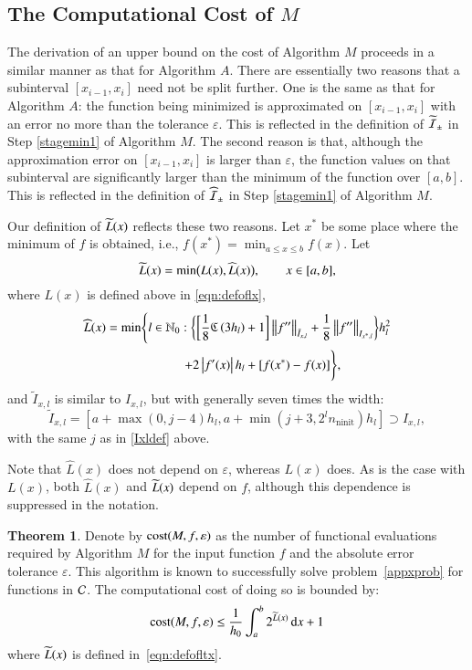\documentclass[review]{elsarticle}
\newcommand{\abstol}{\varepsilon}
\theoremstyle{definition}
\newcommand{\Ixl}{I_{x,l}}
\newcommand{\chL}{\widehat{L}}
\DeclareMathOperator{\ninit}{ninit}
\newtheorem{theorem}{Theorem}
\begin{document}
\subsection{The Computational Cost of $M$} \label{subsec:optcost}
The derivation of an upper bound on the cost of Algorithm $M$ proceeds in a
similar manner as that for Algorithm $A$. There are essentially two reasons that a
subinterval $[x_{i-1},x_i]$ need not be split further. One is the same as that
for Algorithm $A$: the function being minimized is approximated on
$[x_{i-1},x_i]$ with an error no more than the tolerance $\abstol$. This is
reflected in the definition of $\widetilde{\mathcal{I}}_{\pm}$ in Step \ref{stagemin1} of Algorithm
$M$.  The second
reason is that, although the approximation error on $[x_{i-1},x_i]$ is larger
than $\abstol$, the function values on that subinterval are significantly larger
than the minimum of the function over $[a,b]$.  This is reflected in the definition of
$\widehat{\mathcal{I}}_{\pm}$ in Step \ref{stagemin1} of Algorithm $M$.

Our definition of $\widetilde{L}(x)$ reflects these two reasons. Let $x^*$ be some place
where the minimum of $f$ is obtained, i.e.,
$f(x^*)  = \min_{a \le x \le b} f(x).$
Let
\begin{equation}\label{eqn:defofltx}
\tL(x) = \min\bigl(L(x),\chL(x)\bigr), \qquad x \in [a,b],
\end{equation}
where $L(x)$ is defined above in \eqref{eqn:defoflx},
\begin{multline}\label{eqn:defoflt1x}
\chL(x) = \min \Biggl\{ l \in \mathbb{N}_0 :  \biggl\{ \biggl[\frac 18 \fC\left(3h_l\right) + 1
\biggr]   \norm[\tilde{I}_{x,l}]{f''} + \frac18\norm[{I_{x^*,l}}]{f''} \biggr\} h_{l}^2 \\ \qquad
\qquad +  2 \abs{f'(x)} h_{l} + [f(x^*) - f(x)] \Biggr\},
\end{multline}
and $\tilde{I}_{x,l}$ is similar to $\Ixl$, but with generally seven times the width:
\begin{equation}
\tilde{I}_{x,l}=\left[a+\max(0,j-4)h_l, a+ \min(j+3,2^l n_{\ninit})h_l\right] \supset \Ixl,
\end{equation}
with the same $j$ as in \eqref{Ixldef} above.


Note that $\chL(x)$ does not depend on $\abstol$, whereas $L(x)$ does. As is the
case with $L(x)$, both $\chL(x)$ and $\widetilde{L}(x)$ depend on $f$, although this
dependence is suppressed in the notation.

\begin{theorem}\label{thm:Mcost}
	Denote by $\cost(M,f,\abstol)$ as the number of functional evaluations required by
	Algorithm $M$ for the input function $f$ and the absolute error tolerance $\abstol$.
	This algorithm is known to successfully solve problem~\eqref{appxprob} for functions
	in $\mathcal{C}$.  The computational cost of doing so is bounded by:
	\begin{equation*}
	\cost(M,f,\abstol) \le \frac{1}{h_0}\int_a^b 2^{\tL(x)} \, \dif x +1 \\
	\end{equation*}
	where $\widetilde{L}(x)$ is defined in~\eqref{eqn:defofltx}.
\end{theorem}
\end{document}
